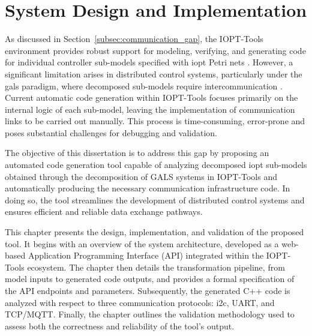 
%

\chapter{System Design and Implementation}
\label{cha:chap_3}


As discussed in Section~\ref{subsec:communication_gap}, the IOPT-Tools environment provides robust support for modeling, verifying, and generating code for individual controller sub-models specified with \gls{iopt} Petri nets \cite{iopttools, barros2004, RefiningIOPT}. However, a significant limitation arises in distributed control systems, particularly under the \gls{gals} paradigm, where decomposed sub-models require intercommunication \cite{galsactd, Barrosadd}. Current automatic code generation within IOPT-Tools focuses primarily on the internal logic of each sub-model, leaving the implementation of communication links to be carried out manually. This process is time-consuming, error-prone and poses substantial challenges for debugging and validation.  

The objective of this dissertation is to address this gap by proposing an automated code generation tool capable of analyzing decomposed \gls{iopt} sub-models obtained through the decomposition of GALS systems in IOPT-Tools and automatically producing the necessary communication infrastructure code. In doing so, the tool streamlines the development of distributed control systems and ensures efficient and reliable data exchange pathways.  

This chapter presents the design, implementation, and validation of the proposed tool. It begins with an overview of the system architecture, developed as a web-based Application Programming Interface (API) integrated within the IOPT-Tools ecosystem. The chapter then details the transformation pipeline, from model inputs to generated code outputs, and provides a formal specification of the API endpoints and parameters. Subsequently, the generated C++ code is analyzed with respect to three communication protocols: \gls{i2c}, UART, and TCP/MQTT. Finally, the chapter outlines the validation methodology used to assess both the correctness and reliability of the tool’s output.  


